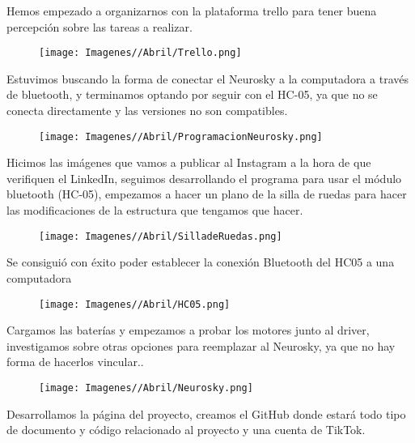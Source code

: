 \documentclass{article}
\begin{document}
Hemos empezado a organizarnos con la plataforma trello para tener buena percepción sobre las tareas a realizar.

\begin{figure}[H]
    \centering
    \texttt{[image: Imagenes//Abril/Trello.png]}
\end{figure}


\newpage

Estuvimos buscando la forma de conectar el Neurosky a la computadora a través de bluetooth, y terminamos optando por seguir con el HC-05, ya que no se conecta directamente y las versiones no son compatibles.



\begin{figure}[H]
    \centering
    \texttt{[image: Imagenes//Abril/ProgramacionNeurosky.png]}
\end{figure}

Hicimos las imágenes que vamos a publicar al Instagram a la hora de que verifiquen el LinkedIn, seguimos desarrollando el programa para usar el módulo bluetooth (HC-05), empezamos a hacer un plano de la silla de ruedas para hacer las modificaciones de la estructura que tengamos que hacer.

\begin{figure}[H]
    \centering
    \texttt{[image: Imagenes//Abril/SilladeRuedas.png]}
\end{figure}

\newpage

Se consiguió con éxito poder establecer la conexión Bluetooth del HC05 a una computadora 

\begin{figure}[H]
    \centering
    \texttt{[image: Imagenes//Abril/HC05.png]}
\end{figure}

Cargamos las baterías y empezamos a probar los motores junto al driver, investigamos sobre otras opciones para reemplazar al Neurosky, ya que no hay forma de hacerlos vincular..

\begin{figure}[H]
    \centering
    \texttt{[image: Imagenes//Abril/Neurosky.png]}
\end{figure}

\newpage

Desarrollamos la página del proyecto, creamos el GitHub donde estará todo tipo de documento y código relacionado al proyecto y una cuenta de TikTok.
\end{document}
